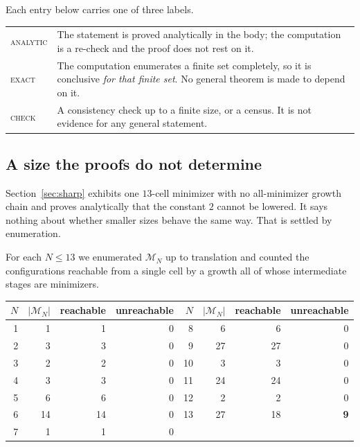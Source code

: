 \documentclass[11pt]{article}
\theoremstyle{plain}
\theoremstyle{definition}
\theoremstyle{remark}
\begin{document}
Each entry below carries one of three labels.

\begin{center}
\begin{tabularx}{\linewidth}{@{}l>{\raggedright\arraybackslash}X@{}}
\toprule
\textsc{analytic} & The statement is proved analytically in the body; the computation is a
re-check and the proof does not rest on it. \\
\textsc{exact} & The computation enumerates a finite set completely, so it is conclusive
\emph{for that finite set}. No general theorem is made to depend on it. \\
\textsc{check} & A consistency check up to a finite size, or a census. It is not evidence
for any general statement. \\
\bottomrule
\end{tabularx}
\end{center}

\subsection{A size the proofs do not determine}\label{sec:16.1}

Section~\ref{sec:sharp} exhibits one \(13\)-cell minimizer with no all-minimizer growth chain
and proves analytically that the constant \(2\) cannot be lowered. It says nothing about
whether smaller sizes behave the same way. That is settled by enumeration.

For each \(N\le13\) we enumerated \(\mathcal{M}_{N}\) up to translation and counted the
configurations reachable from a single cell by a growth all of whose intermediate stages are
minimizers.

\begin{center}
\begin{tabular}{rrrr@{\qquad}rrrr}
\toprule
\(N\) & \(|\mathcal{M}_{N}|\) & reachable & unreachable &
\(N\) & \(|\mathcal{M}_{N}|\) & reachable & unreachable \\
\midrule
1 & 1 & 1 & 0 &  8 & 6 & 6 & 0 \\
2 & 3 & 3 & 0 &  9 & 27 & 27 & 0 \\
3 & 2 & 2 & 0 & 10 & 3 & 3 & 0 \\
4 & 3 & 3 & 0 & 11 & 24 & 24 & 0 \\
5 & 6 & 6 & 0 & 12 & 2 & 2 & 0 \\
6 & 14 & 14 & 0 & 13 & 27 & 18 & \textbf{9} \\
7 & 1 & 1 & 0 &    &    &    &   \\
\bottomrule
\end{tabular}
\end{center}
\end{document}
